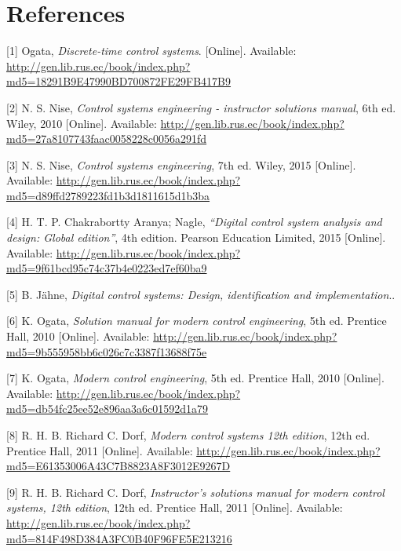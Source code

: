 \section*{References}\label{references}

\hypertarget{refs}{}
\hypertarget{ref-book:129711}{}
{[}1{]} Ogata, \emph{Discrete-time control systems}. {[}Online{]}.
Available:
\url{http://gen.lib.rus.ec/book/index.php?md5=18291B9E47990BD700872FE29FB417B9}

\hypertarget{ref-textbook:niseSolution}{}
{[}2{]} N. S. Nise, \emph{Control systems engineering - instructor
solutions manual}, 6th ed. Wiley, 2010 {[}Online{]}. Available:
\url{http://gen.lib.rus.ec/book/index.php?md5=27a8107743faac0058228c0056a291fd}

\hypertarget{ref-textbook:nise}{}
{[}3{]} N. S. Nise, \emph{Control systems engineering}, 7th ed. Wiley,
2015 {[}Online{]}. Available:
\url{http://gen.lib.rus.ec/book/index.php?md5=d89ffd2789223fd1b3d1811615d1b3ba}

\hypertarget{ref-book:DCSphil}{}
{[}4{]} H. T. P. Chakrabortty Aranya; Nagle, \emph{``Digital control
system analysis and design: Global edition''}, 4th edition. Pearson
Education Limited, 2015 {[}Online{]}. Available:
\url{http://gen.lib.rus.ec/book/index.php?md5=9f61bcd95c74c37b4e0223ed7ef60ba9}

\hypertarget{ref-book:209199}{}
{[}5{]} B. Jähne, \emph{Digital control systems: Design, identification
and implementation}..

\hypertarget{ref-textbook:ogataSolution}{}
{[}6{]} K. Ogata, \emph{Solution manual for modern control engineering},
5th ed. Prentice Hall, 2010 {[}Online{]}. Available:
\url{http://gen.lib.rus.ec/book/index.php?md5=9b555958bb6c026c7c3387f13688f75e}

\hypertarget{ref-textbook:ogata}{}
{[}7{]} K. Ogata, \emph{Modern control engineering}, 5th ed. Prentice
Hall, 2010 {[}Online{]}. Available:
\url{http://gen.lib.rus.ec/book/index.php?md5=db54fc25ee52e896aa3a6c01592d1a79}

\hypertarget{ref-textbook:dorf}{}
{[}8{]} R. H. B. Richard C. Dorf, \emph{Modern control systems 12th
edition}, 12th ed. Prentice Hall, 2011 {[}Online{]}. Available:
\url{http://gen.lib.rus.ec/book/index.php?md5=E61353006A43C7B8823A8F3012E9267D}

\hypertarget{ref-textbook:dorfSolution}{}
{[}9{]} R. H. B. Richard C. Dorf, \emph{Instructor's solutions manual
for modern control systems, 12th edition}, 12th ed. Prentice Hall, 2011
{[}Online{]}. Available:
\url{http://gen.lib.rus.ec/book/index.php?md5=814F498D384A3FC0B40F96FE5E213216}

